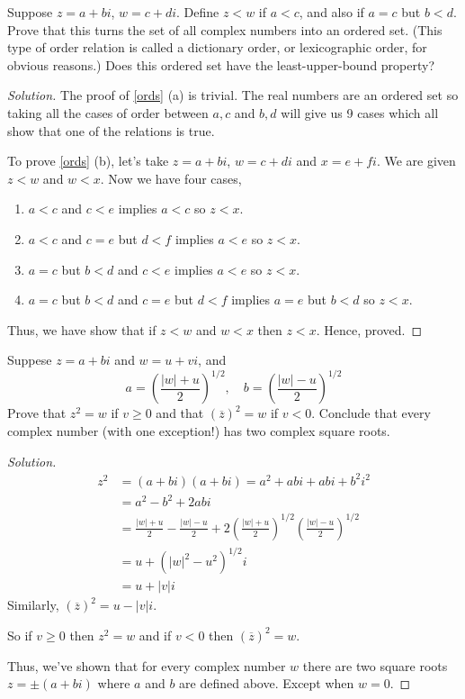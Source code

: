 \begin{prblm}
	Suppose $z = a + bi$, $w = c + di$. Define $z < w$ if $a < c$, and also if $a = c$ but $b < d$.
	Prove that this turns the set of all complex numbers into an ordered set.
	(This type of order relation is called a dictionary order, or lexicographic order, for obvious reasons.)
	Does this ordered set have the least-upper-bound property?

	\begin{proof}[Solution]
		The proof of \ref{ords} (a) is trivial. The real numbers are an ordered set so taking all the cases of
		order between $a, c$ and $b, d$ will give us 9 cases which all show that one of the relations is true.

		To prove \ref{ords} (b), let's take $z = a + bi$, $w = c + di$ and $x = e + fi$.
		We are given $z < w$ and $w < x$. Now we have four cases,
		\begin{enumerate}
			\item $a < c$ and $c < e$ implies $a < c$ so $z < x$.
			\item $a < c$ and $c = e$ but $d < f$ implies $a < e$ so $z < x$.
			\item $a = c$ but $b < d$ and $c < e$ implies $a < e$ so $z < x$.
			\item $a = c$ but $b < d$ and $c = e$ but $d < f$ implies $a = e$ but $b < d$ so $z < x$.
		\end{enumerate}
		Thus, we have show that if $z < w$ and $w < x$ then $z < x$.
		Hence, proved.
	\end{proof}
\end{prblm}

\begin{prblm}
	Suppese $z = a + bi$ and $w = u + vi$, and
	$$	a = \left( \frac{|w| + u}{2} \right)^{1/2} , \quad
		b = \left( \frac{|w| - u}{2} \right)^{1/2} $$
	Prove that $z^2 = w$ if $v \geq 0$ and that $(\overline{z})^2 = w$ if $v < 0$.
	Conclude that every complex number (with one exception!) has two complex square roots.

	\begin{proof}[Solution]
		\begin{align*}
			z^2 & = (a + bi)(a + bi) = a^2 + abi + abi + b^2 i^2 \\
				& = a^2 - b^2 + 2abi \\
				& = \frac{|w|+u}{2} - \frac{|w|-u}{2}
					+ 2 \left( \frac{|w|+u}{2} \right)^{1/2} \left( \frac{|w|-u}{2} \right)^{1/2} \\
				& = u + (|w|^2 - u^2)^{1/2} i \\
				& = u + |v|i
		\end{align*}
		Similarly, $(\overline{z})^2 = u - |v|i$.

		So if $v \geq 0$ then $z^2 = w$ and if $v < 0$ then $(\overline{z})^2 = w$.

		Thus, we've shown that for every complex number $w$ there are two square roots $z = \pm ( a + bi )$
		where $a$ and $b$ are defined above. Except when $w = 0$.
	\end{proof}
\end{prblm}

